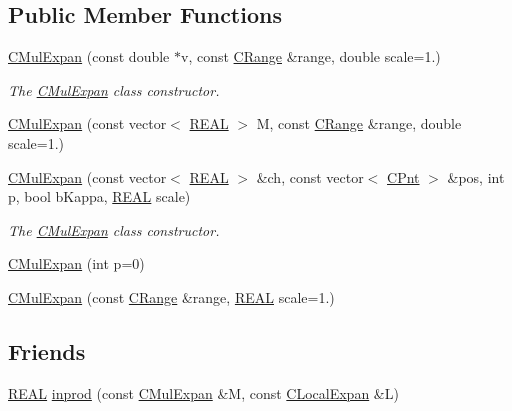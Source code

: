 \subsection*{Public Member Functions}
\begin{DoxyCompactItemize}
\item 
\hyperlink{classCMulExpan_abcef941fb90e2e5c3e220d43396dfc37}{C\-Mul\-Expan} (const double $\ast$v, const \hyperlink{classCRange}{C\-Range} \&range, double scale=1.)
\begin{DoxyCompactList}\small\item\em The \hyperlink{classCMulExpan}{C\-Mul\-Expan} class constructor. \end{DoxyCompactList}\item 
\hyperlink{classCMulExpan_a931ae750321cb051d5d374854bc8a424}{C\-Mul\-Expan} (const vector$<$ \hyperlink{util_8h_a5821460e95a0800cf9f24c38915cbbde}{R\-E\-A\-L} $>$ M, const \hyperlink{classCRange}{C\-Range} \&range, double scale=1.)
\item 
\hyperlink{classCMulExpan_a4256da905269df8c3f78230b69e8e3e1}{C\-Mul\-Expan} (const vector$<$ \hyperlink{util_8h_a5821460e95a0800cf9f24c38915cbbde}{R\-E\-A\-L} $>$ \&ch, const vector$<$ \hyperlink{classCPnt}{C\-Pnt} $>$ \&pos, int p, bool b\-Kappa, \hyperlink{util_8h_a5821460e95a0800cf9f24c38915cbbde}{R\-E\-A\-L} scale)
\begin{DoxyCompactList}\small\item\em The \hyperlink{classCMulExpan}{C\-Mul\-Expan} class constructor. \end{DoxyCompactList}\item 
\hyperlink{classCMulExpan_ae557c77c098763a39a0c5ad266517304}{C\-Mul\-Expan} (int p=0)
\item 
\hyperlink{classCMulExpan_a95beaf89b77d13f7525562138d0ac2df}{C\-Mul\-Expan} (const \hyperlink{classCRange}{C\-Range} \&range, \hyperlink{util_8h_a5821460e95a0800cf9f24c38915cbbde}{R\-E\-A\-L} scale=1.)
\end{DoxyCompactItemize}
\subsection*{Friends}
\begin{DoxyCompactItemize}
\item 
\hyperlink{util_8h_a5821460e95a0800cf9f24c38915cbbde}{R\-E\-A\-L} \hyperlink{classCMulExpan_a020c55be9514911fc8ecde0a8d81a919}{inprod} (const \hyperlink{classCMulExpan}{C\-Mul\-Expan} \&M, const \hyperlink{classCLocalExpan}{C\-Local\-Expan} \&L)
\end{DoxyCompactItemize}
